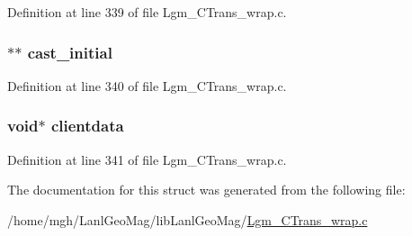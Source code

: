 Definition at line 339 of file Lgm\_\-CTrans\_\-wrap.c.\hypertarget{structswig__module__info_4185798e8e6242699bc018f9183a674c}{
\subsubsection[{cast\_\-initial}]{$\ast$$\ast$ {\bf cast\_\-initial}}}
\label{structswig__module__info_4185798e8e6242699bc018f9183a674c}




Definition at line 340 of file Lgm\_\-CTrans\_\-wrap.c.\hypertarget{structswig__module__info_e60177f52d83fcd32268d79f2aa8012f}{
\subsubsection[{clientdata}]{\setlength{\rightskip}{0pt plus 5cm}void$\ast$ {\bf clientdata}}}
\label{structswig__module__info_e60177f52d83fcd32268d79f2aa8012f}




Definition at line 341 of file Lgm\_\-CTrans\_\-wrap.c.

The documentation for this struct was generated from the following file:\begin{CompactItemize}
\item 
/home/mgh/LanlGeoMag/libLanlGeoMag/\hyperlink{_lgm___c_trans__wrap_8c}{Lgm\_\-CTrans\_\-wrap.c}\end{CompactItemize}
